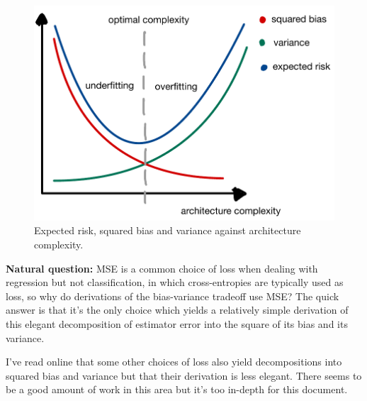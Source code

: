 \documentclass[11pt]{article}
\begin{document}
\begin{figure}[t]
    \centering
    \begin{minipage}{0.6\linewidth}
        \includegraphics[width=\linewidth]{./figures/supervised_learning/bias_variance.pdf}
    \end{minipage}%
    \hfill
    \begin{minipage}{0.35\linewidth}
        \caption{Expected risk, squared bias and variance against architecture complexity.}
        \label{fig:bias_variance}
    \end{minipage}
\end{figure}

\begin{tcolorbox}[title={\centering\textbf{Beyond MSE}}, colback=myLightBlue, colbacktitle=myDarkBlue, colframe=myDarkBlue, coltitle=white]
    \textbf{Natural question:} MSE is a common choice of loss when dealing with regression but not classification, in which cross-entropies are typically used as loss, so why do derivations of the bias-variance tradeoff use MSE? The quick answer is that it's the only choice which yields a relatively simple derivation of this elegant decomposition of estimator error into the square of its bias and its variance.
    
    \hspace{14.2pt} I've read online that some other choices of loss also yield decompositions into squared bias and variance but that their derivation is less elegant. There seems to be a good amount of work in this area but it's too in-depth for this document.
\end{tcolorbox}
\end{document}
